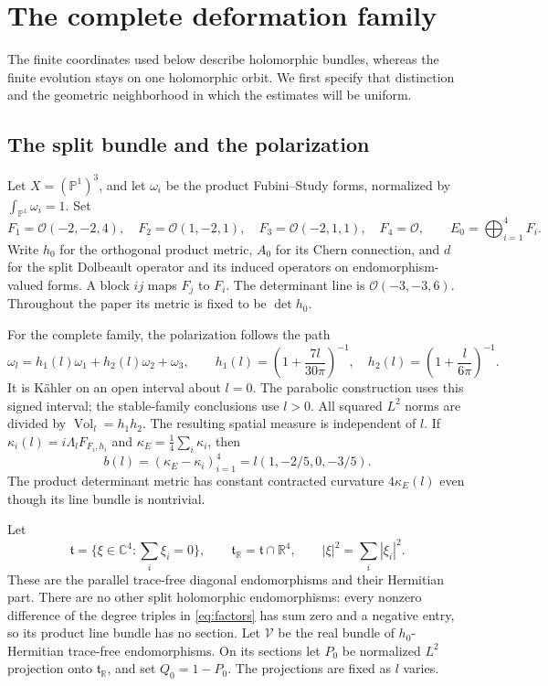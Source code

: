 \documentclass[11pt]{amsart}
\theoremstyle{definition}
\theoremstyle{remark}
\newcommand{\CC}{\mathbb C}
\newcommand{\RR}{\mathbb R}
\newcommand{\PP}{\mathbb P}
\newcommand{\cO}{\mathcal O}
\newcommand{\Vol}{\operatorname{Vol}}
\begin{document}
\section{The complete deformation family}\label{sec:geometry}

The finite coordinates used below describe holomorphic bundles, whereas
the finite evolution stays on one holomorphic orbit. We first specify
that distinction and the geometric neighborhood in which the estimates
will be uniform.

\subsection{The split bundle and the polarization}
Let $X=(\PP^1)^3$, and let $\omega_i$ be the product
Fubini--Study forms, normalized by $\int_{\PP^1}\omega_i=1$.
Set
\begin{equation}\label{eq:factors}
 F_1=\cO(-2,-2,4),\quad F_2=\cO(1,-2,1),\quad
 F_3=\cO(-2,1,1),\quad F_4=\cO,\qquad E_0=\bigoplus_{i=1}^4F_i.
\end{equation}
Write $h_0$ for the orthogonal product metric, $A_0$ for its Chern
connection, and $d$ for the split Dolbeault operator and its induced
operators on endomorphism-valued forms. A block $ij$ maps $F_j$ to $F_i$.
The determinant line is $\cO(-3,-3,6)$. Throughout the paper its
metric is fixed to be $\det h_0$.

For the complete family, the polarization follows the path
\begin{equation}\label{eq:polarization}
 \omega_l=h_1(l)\omega_1+h_2(l)\omega_2+\omega_3,\qquad
 h_1(l)=\left(1+\frac{7l}{30\pi}\right)^{-1},\quad
 h_2(l)=\left(1+\frac{l}{6\pi}\right)^{-1}.
\end{equation}
It is K\"ahler on an open interval about $l=0$. The parabolic
construction uses this signed interval; the stable-family conclusions
use $l>0$. All squared $L^2$ norms are divided by
$\Vol_l=h_1h_2$. The resulting spatial measure is independent of $l$.
If $\kappa_i(l)=i\Lambda_lF_{F_i,h_i}$ and
$\kappa_E=\frac14\sum_i\kappa_i$, then
\begin{equation}\label{eq:slopes}
 b(l)=(\kappa_E-\kappa_i)_{i=1}^4
       =l(1,-2/5,0,-3/5).
\end{equation}
The product determinant metric has constant contracted curvature
$4\kappa_E(l)$ even though its line bundle is nontrivial.

Let
\[
 \mathfrak t=\{\xi\in\CC^4:\textstyle\sum_i\xi_i=0\},\qquad
 \mathfrak t_{\RR}=\mathfrak t\cap\RR^4,\qquad
 |\xi|^2=\sum_i|\xi_i|^2.
\]
These are the parallel trace-free diagonal endomorphisms and their
Hermitian part. There are no other split holomorphic endomorphisms:
every nonzero difference of the degree triples in \eqref{eq:factors}
has sum zero and a negative entry, so its product line bundle has
no section. Let $\mathcal V$ be the real bundle of $h_0$-Hermitian
trace-free endomorphisms. On its sections let $P_0$ be normalized
$L^2$ projection onto $\mathfrak t_{\RR}$, and set $Q_0=1-P_0$.
The projections are fixed as $l$ varies.
\end{document}
